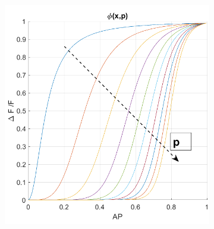 \documentclass[12pt, a4paper]{report}
\begin{document}
\begin{figure}[H]
	\begin{minipage}{\linewidth}
		\centering
		\begin{minipage}{0.45\linewidth}
			\begin{figure}[H]
				\includegraphics[width=\linewidth]{phi.png}
				

\end{figure}
\end{minipage}
\end{minipage}
\end{figure}
\end{document}

